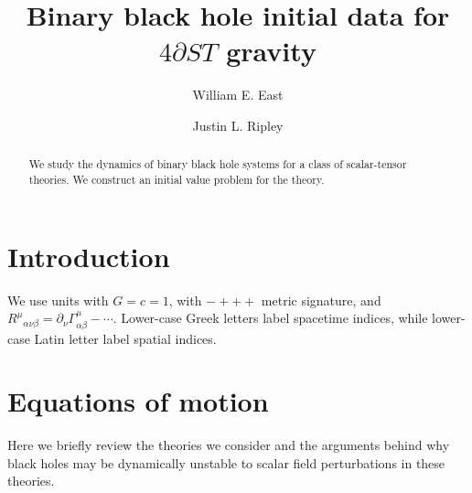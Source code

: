 \documentclass[%
notitlepage,
report,
nofootinbib,
 amsmath,amssymb,
 aps,
]{revtex4-1}
\newcommand{\ssec}[1]{\section{#1}}
\begin{document}
\title{Binary black hole initial data for $4\partial ST$ gravity}
\author{William E. East}
%
\author{Justin L. Ripley}
%
\begin{abstract}
We study the dynamics of binary black hole systems for a class of
scalar-tensor theories.
We construct an initial value problem for the theory.
\end{abstract}
\maketitle
\ssec{Introduction}%
We use units with $G=c=1$, with $-+++$ metric signature, and
$R^{\mu}{}_{\alpha\nu\beta}=\partial_{\nu}\Gamma^{\mu}_{\alpha\beta}-\cdots$.
Lower-case Greek letters label spacetime indices, while lower-case
Latin letter label spatial indices.
\ssec{Equations of motion}%
Here we briefly review the theories we consider and the arguments
behind why black holes may be dynamically unstable to scalar
field perturbations in these theories.
\end{document}
